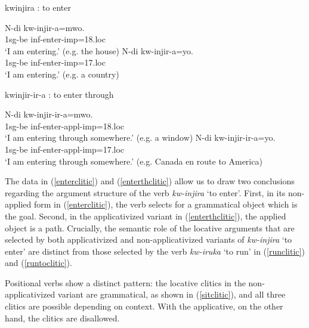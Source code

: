 \documentclass[output=paper]{langsci/langscibook}
\begin{document}
\begin{exe}
	\ex\label{enterclitic} {\sc kwinjira} : to enter \begin{xlist}
		\ex\gll N-di kw-injir-a=mwo.\\
				1{\sc sg-be} {\sc inf-}enter-{\sc imp=18.loc}\\
				\glt `I am entering.' (e.g. the house)
		\ex\gll N-di kw-injir-a=yo.\\
				1{\sc sg-be} {\sc inf-}enter-{\sc imp=17.loc}\\
				\glt `I am entering.' (e.g. a country)
	\end{xlist}
	\ex\label{enterthclitic} {\sc kwinjir-ir-a} : to enter through \begin{xlist}
		\ex\gll N-di kw-injir-ir-a=mwo.\\
				1{\sc sg-be} {\sc inf-}enter-{\sc appl-imp=18.loc}\\
				\glt `I am entering through somewhere.' (e.g. a window)
		\ex\gll N-di kw-injir-ir-a=yo.\\
				1{\sc sg-be} {\sc inf-}enter-{\sc appl-imp=17.loc}\\
				\glt `I am entering through somewhere.' (e.g. Canada en route to America)
		\end{xlist}
		\end{exe}
%
The data in (\ref{enterclitic}) and (\ref{enterthclitic}) allow us to draw two conclusions regarding the argument structure of the verb \emph{kw-injira} `to enter'. First, in its non-applied form in (\ref{enterclitic}), the verb selects for a grammatical object which is the {\sc goal}. Second, in the applicativized variant in (\ref{enterthclitic}), the applied object is a {\sc path}. Crucially, the semantic role of the locative arguments that are selected by both applicativized and  non-applicativized variants of \emph{kw-injira} `to enter' are distinct from those selected by the verb \emph{kw-iruka} `to run' in (\ref{runclitic}) and (\ref{runtoclitic}). 


\iffalse
 Positional verbs show a distinct pattern: the locative clitics in the non-applicativized variant are grammatical, as shown in (\ref{sitclitic}), and all three clitics are possible depending on context. With the applicative, on the other hand, the clitics are disallowed.
 
\end{document}
